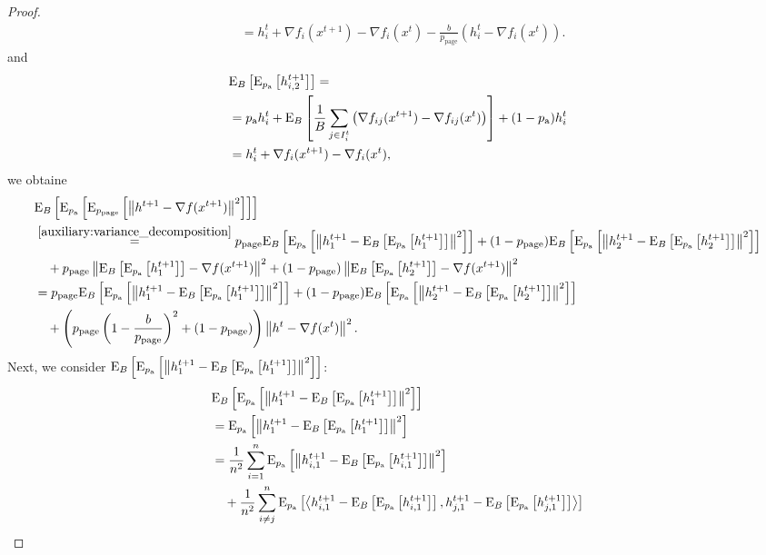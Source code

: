 \documentclass{article}
\newcommand*{\probavailable}{\ensuremath{p_{\textnormal{a}}}}
\newcommand*{\probpage}{\ensuremath{p_{\text{page}}}}
\begin{document}
\begin{proof}
\begin{align*}
    &= h^t_i + \nabla f_i(x^{t+1}) - \nabla f_i(x^{t}) - \frac{b}{\probpage} \left(h^t_i - \nabla f_i(x^{t})\right).
  \end{align*}
  and 
  \begin{align*}
    &\ExpSub{B}{\ExpSub{\probavailable}{h^{t+1}_{i,2}}} = \\
    &=\probavailable h^t_i +  \ExpSub{B}{\frac{1}{B}\sum_{j \in I^t_i}\left(\nabla f_{ij}(x^{t+1}) - \nabla f_{ij}(x^{t})\right)} + (1 - \probavailable) h^t_i \\
    &= h^t_i + \nabla f_i(x^{t+1}) - \nabla f_i(x^{t}),
  \end{align*}
  we obtaine
  \begin{align*}
    &\ExpSub{B}{\ExpSub{\probavailable}{\ExpSub{\probpage}{\norm{h^{t+1} - \nabla f(x^{t+1})}^2}}} \\
    &\overset{\eqref{auxiliary:variance_decomposition}}{=}\probpage\ExpSub{B}{\ExpSub{\probavailable}{\norm{h^{t+1}_{1} - \ExpSub{B}{\ExpSub{\probavailable}{h^{t+1}_{1}}}}^2}} + (1 - \probpage)\ExpSub{B}{\ExpSub{\probavailable}{\norm{h^{t+1}_{2} - \ExpSub{B}{\ExpSub{\probavailable}{h^{t+1}_{2}}}}^2}} \\
    &\quad +\probpage\norm{\ExpSub{B}{\ExpSub{\probavailable}{h^{t+1}_{1}}} - \nabla f(x^{t+1})}^2 + (1 - \probpage)\norm{\ExpSub{B}{\ExpSub{\probavailable}{h^{t+1}_{2}}} - \nabla f(x^{t+1})}^2 \\
    &=\probpage\ExpSub{B}{\ExpSub{\probavailable}{\norm{h^{t+1}_{1} - \ExpSub{B}{\ExpSub{\probavailable}{h^{t+1}_{1}}}}^2}} + (1 - \probpage)\ExpSub{B}{\ExpSub{\probavailable}{\norm{h^{t+1}_{2} - \ExpSub{B}{\ExpSub{\probavailable}{h^{t+1}_{2}}}}^2}} \\
    &\quad +\left(\probpage\left(1 - \frac{b}{\probpage}\right)^2 + (1 - \probpage)\right)\norm{h^{t} - \nabla f(x^{t})}^2.
  \end{align*}
  Next, we consider $\ExpSub{B}{\ExpSub{\probavailable}{\norm{h^{t+1}_{1} - \ExpSub{B}{\ExpSub{\probavailable}{h^{t+1}_{1}}}}^2}}$:
  \begin{align*}
    &\ExpSub{B}{\ExpSub{\probavailable}{\norm{h^{t+1}_{1} - \ExpSub{B}{\ExpSub{\probavailable}{h^{t+1}_{1}}}}^2}}\\
    &=\ExpSub{\probavailable}{\norm{h^{t+1}_{1} - \ExpSub{B}{\ExpSub{\probavailable}{h^{t+1}_{1}}}}^2} \\
    &=\frac{1}{n^2}\sum_{i=1}^n\ExpSub{\probavailable}{\norm{h^{t+1}_{i,1} - \ExpSub{B}{\ExpSub{\probavailable}{h^{t+1}_{i,1}}}}^2} \\
    &\quad +\frac{1}{n^2}\sum_{i\neq j}^n\ExpSub{\probavailable}{\inp{h^{t+1}_{i,1} - \ExpSub{B}{\ExpSub{\probavailable}{h^{t+1}_{i,1}}}}{h^{t+1}_{j,1} - \ExpSub{B}{\ExpSub{\probavailable}{h^{t+1}_{j,1}}}}} \\

\end{align*}
\end{proof}
\end{document}

